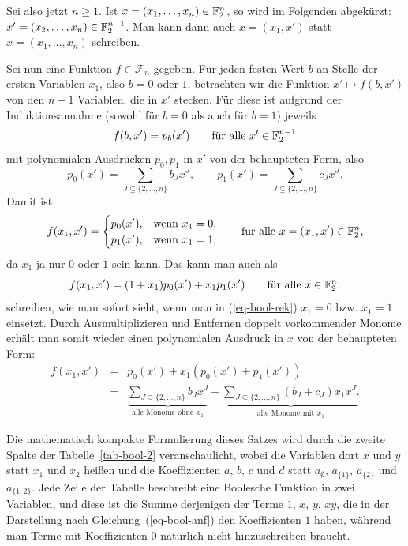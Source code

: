 \begin{refsegment}
\begin{Beweis}
   Sei also jetzt $n \geq 1$. Ist $x = (x_1,\ldots,x_n) \in \mathbb{F}_2^n$, so
   wird im Folgenden abgekürzt: $x' = (x_2,\ldots,x_n) \in \mathbb{F}_2^{n-1}$.
   Man kann dann auch $x = (x_1, x')$ statt $x = (x_1, \ldots, x_n)$
   schreiben.

   Sei nun eine Funktion $f \in \mathcal{F}_n$ gegeben. Für jeden festen
   Wert $b$ an Stelle der ersten Variablen $x_1$, also $b = 0$ oder $1$,
   betrachten wir die Funktion $x' \mapsto f(b,x')$ von den $n-1$ Variablen,
   die in $x'$ stecken. Für diese ist aufgrund der Induktionsannahme
   (sowohl für $b = 0$ als auch für $b = 1$) jeweils
\[
      f(b,x') = p_b(x') \qquad \textrm{für alle } x' \in \mathbb{F}_2^{n-1}
\]
   mit polynomialen Ausdrücken $p_0, p_1$ in $x'$ von der behaupteten
   Form, also
\[
     p_0(x') = \sum_{J \subseteq \{2,\ldots,n\}} b_J x^J, \qquad
     p_1(x') = \sum_{J \subseteq \{2,\ldots,n\}} c_J x^J.
\]
   Damit ist
\[
     f(x_1,x') = \begin{cases}
              p_0(x'), & \text{wenn } x_1 = 0, \\
              p_1(x'), & \text{wenn } x_1 = 1,
           \end{cases}
       \qquad \textrm{für alle } x = (x_1, x') \in \mathbb{F}_2^n,
\]
   da $x_1$ ja nur $0$ oder $1$ sein kann. Das kann man auch als
\begin{equation}\label{eq-bool-rek}
     f(x_1,x') = (1 + x_1) p_0(x') + x_1 p_1(x') \qquad
                       \textrm{für alle } x \in \mathbb{F}_2^n,
\end{equation}
   schreiben, wie man sofort sieht, wenn man in (\ref{eq-bool-rek}) $x_1 = 0$
   bzw. \mbox{$x_1 = 1$} einsetzt. Durch Ausmultiplizieren und Entfernen doppelt
   vorkommender Monome erhält man somit wieder einen polynomialen Ausdruck in $x$
   von der behaupteten Form:
\begin{eqnarray*}
     f(x_1,x') & = & p_0(x') + x_1 (p_0(x') + p_1(x'))\\
     & = & \underbrace{\sum_{J \subseteq \{2,\ldots,n\}} b_J x^J}_{\text{alle Monome ohne } x_1}
     + \underbrace{\sum_{J \subseteq \{2,\ldots,n\}} (b_J + c_J) x_1 x^J.}_{\text{alle Monome mit } x_1}
\end{eqnarray*}
\end{Beweis}

Die mathematisch kompakte Formulierung dieses Satzes wird durch die
zweite Spalte der Tabelle~\ref{tab-bool-2} veranschaulicht,
wobei die Variablen dort $x$ und $y$ statt $x_1$ und $x_2$ heißen
und die Koeffizienten $a$, $b$, $c$ und $d$ statt $a_{\emptyset}$,
$a_{\{1\}}$, $a_{\{2\}}$ und $a_{\{1, 2\}}$. Jede Zeile der Tabelle
beschreibt eine Boolesche Funktion in zwei Variablen, und diese
ist die Summe derjenigen der Terme $1$, $x$, $y$, $xy$,
die in der Darstellung nach Gleichung~(\ref{eq-bool-anf}) den
Koeffizienten $1$ haben, während man Terme mit Koeffizienten $0$
natürlich nicht hinzuschreiben braucht.


\end{refsegment}
